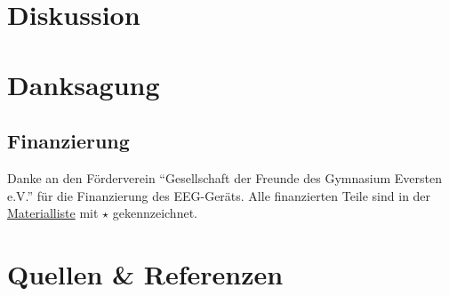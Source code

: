 \documentclass{scrartcl}
\begin{document}
	\section{Diskussion}

	\section{Danksagung}

	\subsection{Finanzierung} \label{Foerderverein}

	Danke an den Förderverein \enquote{Gesellschaft der Freunde des Gymnasium Eversten e.V.} für die Finanzierung des EEG-Geräts. Alle finanzierten Teile sind in der \hyperref[Materialien]{Materialliste} mit $\star$ gekennzeichnet. 

	\section{Quellen \& Referenzen}

	\printbibliography{}
\end{document}
